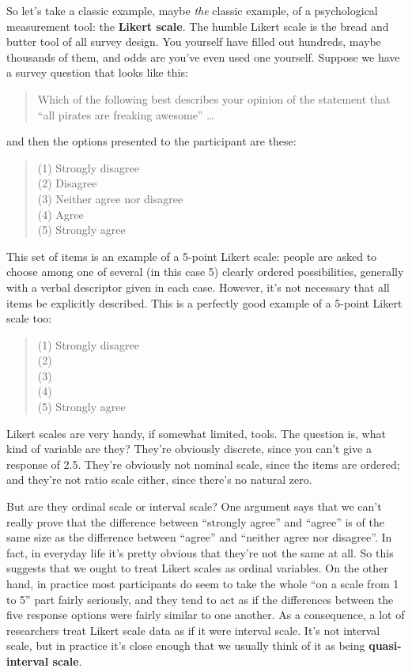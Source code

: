\documentclass[
]{book}
\begin{document}
So let's take a classic example, maybe {\emph{the}} classic example, of a psychological measurement tool: the \textbf{Likert scale}. The humble Likert scale is the bread and butter tool of all survey design. You yourself have filled out hundreds, maybe thousands of them, and odds are you've even used one yourself. Suppose we have a survey question that looks like this:

\begin{quote}
Which of the following best describes your opinion of the statement that ``all pirates are freaking awesome'' \ldots{}
\end{quote}

and then the options presented to the participant are these:

\begin{quote}
(1) Strongly disagree\\
(2) Disagree\\
(3) Neither agree nor disagree\\
(4) Agree\\
(5) Strongly agree
\end{quote}

This set of items is an example of a 5-point Likert scale: people are asked to choose among one of several (in this case 5) clearly ordered possibilities, generally with a verbal descriptor given in each case. However, it's not necessary that all items be explicitly described. This is a perfectly good example of a 5-point Likert scale too:

\begin{quote}
(1) Strongly disagree\\
(2)\\
(3)\\
(4)\\
(5) Strongly agree
\end{quote}

Likert scales are very handy, if somewhat limited, tools. The question is, what kind of variable are they? They're obviously discrete, since you can't give a response of 2.5. They're obviously not nominal scale, since the items are ordered; and they're not ratio scale either, since there's no natural zero.

But are they ordinal scale or interval scale? One argument says that we can't really prove that the difference between ``strongly agree'' and ``agree'' is of the same size as the difference between ``agree'' and ``neither agree nor disagree''. In fact, in everyday life it's pretty obvious that they're not the same at all. So this suggests that we ought to treat Likert scales as ordinal variables. On the other hand, in practice most participants do seem to take the whole ``on a scale from 1 to 5'' part fairly seriously, and they tend to act as if the differences between the five response options were fairly similar to one another. As a consequence, a lot of researchers treat Likert scale data as if it were interval scale. It's not interval scale, but in practice it's close enough that we usually think of it as being \textbf{quasi-interval scale}.
\end{document}
